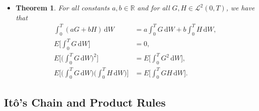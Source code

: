 \documentclass[10pt]{article}
\newtheorem{theorem}[lemma]{Theorem}
\newcommand{\dee}{\mathrm{d}}
\newcommand{\mcal}[1]{\mathcal{#1}}
\newcommand{\Real}{\mathbb{R}}
\begin{document}
\begin{itemize}
  \item \begin{theorem}
    For all constants $a, b \in \Real$ and for all $G, H \in \mcal{L}^2(0,T)$, we have that
    \begin{align*}
      \int_0^T (aG + bH)\, \dee W &= a \int_0^T G\, \dee W + b \int_0^T H\, \dee W, \\
      E\bigg[ \int_0^T G\, \dee W \bigg] &= 0, \\
      E\bigg[ \bigg( \int_0^T G\, \dee W \bigg)^2 \bigg] &= E \bigg[ \int_0^T G^2\, \dee W \bigg], \\
      E\bigg[ \bigg( \int_0^T G\, \dee W \bigg) \bigg( \int_0^T H\, \dee W \bigg) \bigg] &= E \bigg[ \int_0^T GH \, \dee W \bigg]. 
    \end{align*}
  \end{theorem}
\end{itemize}

\subsection{It\^{o}'s Chain and Product Rules}
\end{document}
